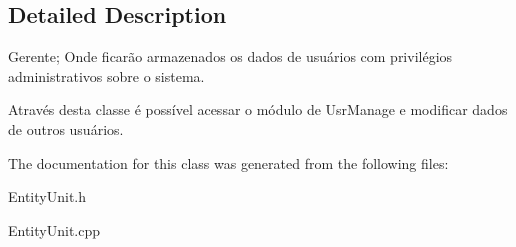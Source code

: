 \subsection{Detailed Description}
Gerente; Onde ficarão armazenados os dados de usuários com privilégios administrativos sobre o sistema. 

Através desta classe é possível acessar o módulo de Usr\-Manage e modificar dados de outros usuários. 

The documentation for this class was generated from the following files\-:\begin{DoxyCompactItemize}
\item 
Entity\-Unit.\-h\item 
Entity\-Unit.\-cpp\end{DoxyCompactItemize}

